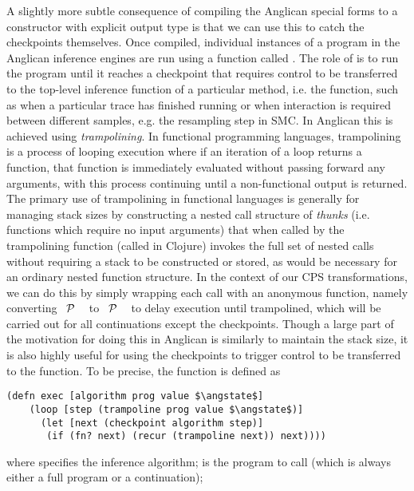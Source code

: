 A slightly more subtle consequence of compiling the Anglican special forms to a constructor with explicit output
type is that
we can use this to catch the checkpoints themselves.  Once compiled, individual instances of
a program in the Anglican inference engines are run using a function called .  The role of
 is to run the program until it reaches a checkpoint that requires control to be transferred
to the top-level inference function of a particular method, i.e. the \anginfer function, such as when
a particular trace has finished running or when interaction is required between different samples, e.g. 
the resampling step in SMC.  In Anglican this is achieved using \emph{trampolining}.  In functional
programming languages, trampolining is a process of looping execution where if an iteration of
a loop returns a function, that function is immediately evaluated without passing forward any arguments,
with this process continuing until a non-functional output is returned.  The primary use of trampolining
in functional languages is generally
for managing stack sizes by constructing a nested call structure of \emph{thunks} (i.e. functions which
require no input arguments) that when called by the trampolining function (called  in Clojure)
invokes the full set of nested calls without requiring a stack to be constructed or stored, as would be necessary
for an ordinary nested function structure.  In the context of our CPS transformations, we can do this by simply
wrapping each call with an anonymous function, namely converting ~$\mathcal{P}$ ~\angstate\clj{)}
to ~$\mathcal{P}$ ~\angstate\clj{))} to delay execution until trampolined, which will be carried out for all continuations
except the checkpoints.  Though a large part of the motivation for doing this in
Anglican is similarly to maintain the stack size, it is also highly useful for using the checkpoints to trigger
control to be transferred to the \anginfer function.  To be precise, the  function is defined as
\begin{lstlisting}[basicstyle=\ttfamily\small,frame=none]
  (defn exec [algorithm prog value $\angstate$]
    (loop [step (trampoline prog value $\angstate$)]
      (let [next (checkpoint algorithm step)]
       (if (fn? next) (recur (trampoline next)) next))))
\end{lstlisting}\vspace{-8pt}
where  specifies the inference algorithm;  is the program to call (which is always either
a full program or a continuation); 
